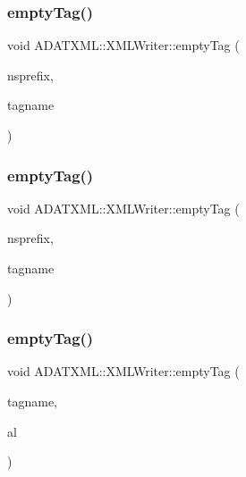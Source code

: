 \subsubsection{\texorpdfstring{emptyTag()}{emptyTag()}\hspace{0.1cm}{\footnotesize\ttfamily [5/12]}}
{\footnotesize\ttfamily void A\+D\+A\+T\+X\+M\+L\+::\+X\+M\+L\+Writer\+::empty\+Tag (\begin{DoxyParamCaption}\item[{const std\+::string \&}]{nsprefix,  }\item[{const std\+::string \&}]{tagname }\end{DoxyParamCaption})}

\mbox{\label{classADATXML_1_1XMLWriter_a7941500f8d733594745588b65ff4789c}} 
\subsubsection{\texorpdfstring{emptyTag()}{emptyTag()}\hspace{0.1cm}{\footnotesize\ttfamily [6/12]}}
{\footnotesize\ttfamily void A\+D\+A\+T\+X\+M\+L\+::\+X\+M\+L\+Writer\+::empty\+Tag (\begin{DoxyParamCaption}\item[{const std\+::string \&}]{nsprefix,  }\item[{const std\+::string \&}]{tagname }\end{DoxyParamCaption})}

\mbox{\label{classADATXML_1_1XMLWriter_a48c5adaca1b1c8126047c410c86644f3}} 
\subsubsection{\texorpdfstring{emptyTag()}{emptyTag()}\hspace{0.1cm}{\footnotesize\ttfamily [7/12]}}
{\footnotesize\ttfamily void A\+D\+A\+T\+X\+M\+L\+::\+X\+M\+L\+Writer\+::empty\+Tag (\begin{DoxyParamCaption}\item[{const std\+::string \&}]{tagname,  }\item[{\mbox{\hyperlink{namespaceXMLWriterAPI_a28cf3d8051a4ccf0aef208b7ebc66d07}{X\+M\+L\+Writer\+A\+P\+I\+::\+Attribute\+List}} \&}]{al }\end{DoxyParamCaption})}

